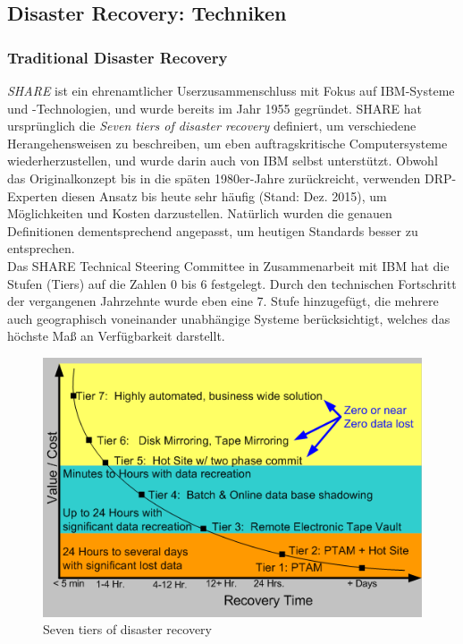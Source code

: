 \documentclass[letterpaper, 12pt]{article}
\let\tempsubsection\subsection
\renewcommand\subsection[1]{\vspace{0cm}\tempsubsection{#1}\vspace{0cm}}
\let\tempsubsubsection\subsubsection
\renewcommand\subsubsection[1]{\vspace{0cm}\tempsubsubsection{#1}\vspace{0cm}}
\begin{document}
\subsection{Disaster Recovery: Techniken \cite{traddr} \cite{traddr2}}

\subsubsection{Traditional Disaster Recovery}

\textit{SHARE} ist ein ehrenamtlicher Userzusammenschluss mit Fokus auf IBM-Systeme und -Technologien, und wurde bereits im Jahr 1955 gegründet. SHARE hat ursprünglich die \textit{Seven tiers of disaster recovery} definiert, um verschiedene Herangehensweisen zu beschreiben, um eben auftragskritische Computersysteme wiederherzustellen, und wurde darin auch von IBM selbst unterstützt. Obwohl das Originalkonzept bis in die späten 1980er-Jahre zurückreicht, verwenden DRP-Experten diesen Ansatz bis heute sehr häufig (Stand: Dez. 2015), um Möglichkeiten und Kosten darzustellen. Natürlich wurden die genauen Definitionen dementsprechend angepasst, um heutigen Standards besser zu entsprechen. \\
Das SHARE Technical Steering Committee in Zusammenarbeit mit IBM hat die Stufen (Tiers) auf die Zahlen 0 bis 6 festgelegt. Durch den technischen Fortschritt der vergangenen Jahrzehnte wurde eben eine 7. Stufe hinzugefügt, die mehrere auch geographisch voneinander unabhängige Systeme berücksichtigt, welches das höchste Maß an Verfügbarkeit darstellt.

\begin{figure}[h]
	\begin{center}
		\includegraphics[width=0.6\linewidth]{images/7-tier}
		\caption{Seven tiers of disaster recovery \cite{bild1}}
		\label{Seven tiers of disaster recovery}
	\end{center}
\end{figure}
\end{document}
